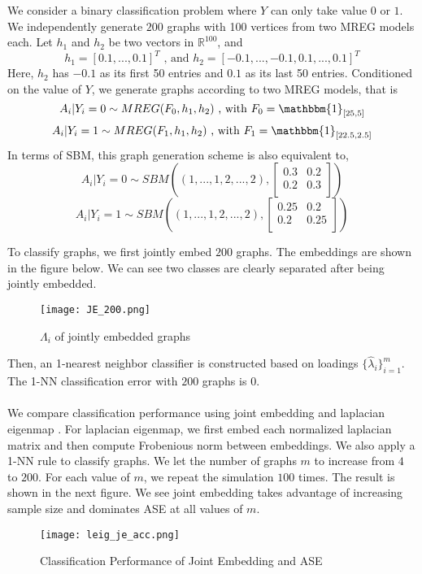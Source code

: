 \documentclass[10pt,journal,compsoc]{IEEEtran}
\begin{document}
\noindent We consider a binary classification problem where $Y$ can only take value $0$ or $1$. We independently generate $200$ graphs with 100 vertices from two MREG models each. Let $h_1$ and $h_2$ be two vectors in $\mathbb{R}^{100}$, and \[h_1=[0.1,...,0.1]^T \text{ , and } h_2=[-0.1,...,-0.1,0.1,...,0.1]^T \] 
Here, $h_2$ has $-0.1$ as its first 50 entries and $0.1$ as its last 50 entries. Conditioned on the value of $Y$, we generate graphs according to two MREG models, that is 
\[A_i|Y_i=0 \sim MREG(F_0,h_1,h_2) \text{ , with } F_0= \mathbbm{1}_{[25,5]} \]
\[A_i|Y_i=1 \sim MREG(F_1,h_1,h_2) \text{ , with } F_1= \mathbbm{1}_{[22.5,2.5]} \]
In terms of SBM, this graph generation scheme is also equivalent to,
\[ A_i|Y_i=0 \sim  SBM((1,...,1,2,...,2),\begin{bmatrix} 0.3 & 0.2 \\ 0.2 & 0.3 \\ \end{bmatrix})  \]
\[ A_i|Y_i=1 \sim  SBM((1,...,1,2,...,2),\begin{bmatrix} 0.25 & 0.2 \\ 0.2 & 0.25 \\ \end{bmatrix})\]

\noindent To classify graphs, we first jointly embed $200$ graphs. The embeddings are shown in the figure below. We can see two classes are clearly separated after being jointly embedded.
\begin{figure}[!htbp]
	\centering
	\texttt{[image: JE\_200.png]}
	\caption{$\Lambda_i$ of jointly embedded graphs}
\end{figure}
Then, an 1-nearest neighbor classifier is constructed based on loadings $\{\hat{\lambda}_i\}_{i=1}^m$. The 1-NN classification error with $200$ graphs is $0$. \\
\\
\noindent We compare classification performance using joint embedding and laplacian eigenmap \cite{belkin2003laplacian}. For laplacian eigenmap, we first embed each normalized laplacian matrix and then compute Frobenious norm between embeddings. We also apply a 1-NN rule to classify graphs. We let the number of graphs $m$ to increase from $4$ to $200$. For each value of $m$, we repeat the simulation $100$ times. The result is shown in the next figure. We see joint embedding takes advantage of increasing sample size and dominates ASE at all values of $m$. 
\begin{figure}[!htbp]
	\centering
	\texttt{[image: leig\_je\_acc.png]}
	\caption{Classification Performance of Joint Embedding and ASE}
\end{figure} 
\end{document}
